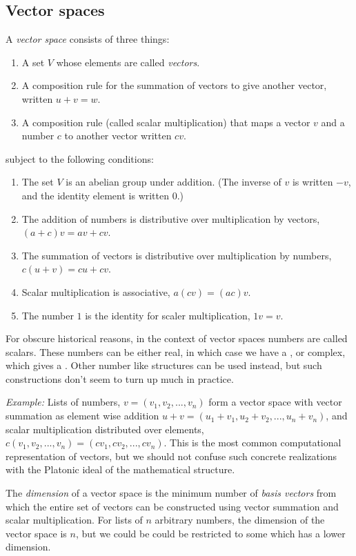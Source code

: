 
\subsection{Vector spaces}
A {\sl vector space} consists of three things:
  \begin{enumerate}
 \item A set $V$ whose elements are called {\sl vectors}.
 \item A composition rule for the summation of vectors to give another vector, written $u+v=w$.
 \item A composition rule (called  scalar multiplication) that maps a vector $v$ and a number $c$ to another vector written $cv$.
 \end{enumerate}
subject to the following conditions:
  \begin{enumerate}
  \item The set $V$ is an abelian group under addition. (The inverse of $v$ is written $-v$, and the identity element is written $0$.)
  \item The addition of numbers is distributive over multiplication by vectors, $(a+c)v=av + cv$.
  \item The summation of vectors is distributive over multiplication by numbers, $c(u+v)=cu + cv$.
  \item Scalar multiplication is associative, $a (cv) = (ac) v$. 
 \item The number $1$ is the identity for scaler multiplication, $1v=v$.
 \end{enumerate}
 For obscure historical reasons, in the context of vector spaces numbers are called scalars.
These numbers can be either real, in which case we have a , or complex, which gives a . Other number like structures can be used instead, but such constructions don't seem to turn up much in practice. 

{\sl Example:} Lists of numbers, $v=(v_1, v_2, ..., v_n)$ form a vector space with vector summation as element wise addition $u+v = (u_1+v_1, u_2 +v_2, ..., u_n+ v_n)$, and scalar multiplication distributed over elements, $c(v_1, v_2, ..., v_n) =(cv_1, cv_2, ..., cv_n)$. This is the most common computational representation of vectors, but we should not confuse such concrete realizations with the Platonic ideal of the mathematical structure. 

The {\sl dimension} of a vector space is the minimum number of {\sl basis vectors} from which the entire set of vectors can be constructed using vector summation and scalar multiplication. For lists of $n$ arbitrary numbers, the dimension of the vector space is $n$, but we could be could be restricted to some  which has a lower dimension. 



